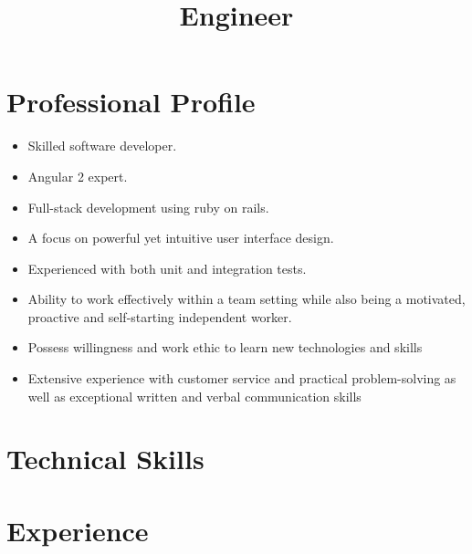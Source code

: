 \documentclass[11pt,a4paper,sans]{moderncv}        %
\title{Engineer}                               %
\begin{document}
\makecvtitle
\section{Professional Profile}
\begin{itemize}%
	\item Skilled software developer.
	\item Angular 2 expert.
	\item Full-stack development using ruby on rails.
	\item A focus on powerful yet intuitive user interface design.
	\item Experienced with both unit and integration tests. 
	\item Ability to work effectively within a team setting	while also being a motivated, proactive and self-starting independent worker.
	\item Possess willingness and work ethic to learn new technologies and skills
	\item Extensive experience with customer service and practical problem-solving as well as exceptional written and verbal communication skills
\end{itemize}

\section{Technical Skills}

\section{Experience}
\end{document}

